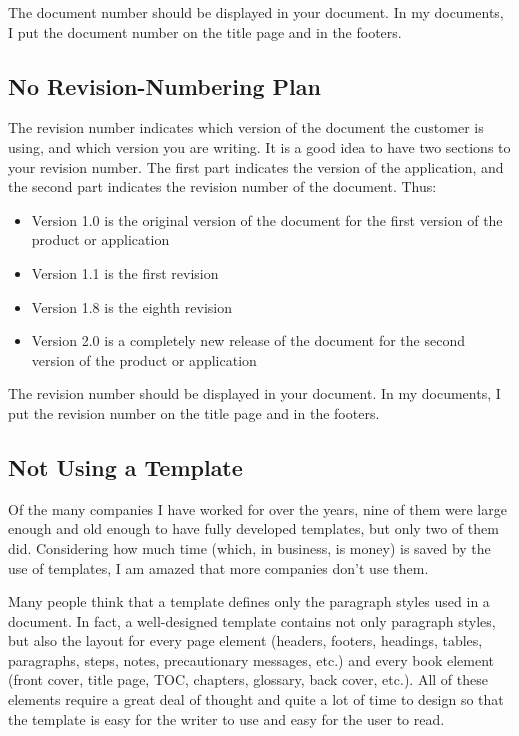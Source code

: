 \documentclass[12pt]{article}
\begin{document}
The document number should be displayed in your document. In my documents, I put the document number on the title page and in the footers.

\subsection{No Revision-Numbering Plan}
The revision number indicates which version of the document the customer is using, and which version you are writing. It is a good idea to have two sections to your revision number. The first part indicates the version of the application, and the second part indicates the revision number of the document. Thus:

\begin{itemize} \itemsep -2pt
	\item Version 1.0 is the original version of the document for the first version of the product or application
	\item Version 1.1 is the first revision
	\item Version 1.8 is the eighth revision
	\item Version 2.0 is a completely new release of the document for the second version of the product or application
\end{itemize}
The revision number should be displayed in your document. In my documents, I put the revision number on the title page and in the footers.

\subsection{Not Using a Template}
Of the many companies I have worked for over the years, nine of them were large enough and old enough to have fully developed templates, but only two of them did. Considering how much time (which, in business, is money) is saved by the use of templates, I am amazed that more companies don't use them.

Many people think that a template defines only the paragraph styles used in a document. In fact, a well-designed template contains not only paragraph styles, but also the layout for every page element (headers, footers, headings, tables, paragraphs, steps, notes,
precautionary messages, etc.) and every book element (front cover, title page, TOC, chapters, glossary, back cover, etc.). All of
these elements require a great deal of thought and quite a lot of time to design so that the template is easy for the writer to use and easy for the user to read.
\end{document}
